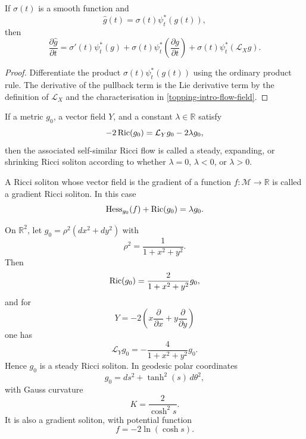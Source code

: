 \begin{proposition}
\label{topping-intro-pushforward-evolution}
If $\sigma(t)$ is a smooth function and
\[
\hat g(t)=\sigma(t)\psi_t^*(g(t)),
\]
then
\[
\frac{\partial \hat g}{\partial t}
=\sigma'(t)\psi_t^*(g)+\sigma(t)\psi_t^*\!\left(\frac{\partial g}{\partial t}\right)
+\sigma(t)\psi_t^*(\mathcal L_X g).
\]
\end{proposition}

\begin{proof}
Differentiate the product $\sigma(t)\psi_t^*(g(t))$ using the ordinary product
rule. The derivative of the pullback term is the Lie derivative term by the
definition of $\mathcal L_X$ and the characterisation in
\eqref{topping-intro-flow-field}.
\end{proof}

\begin{definition}
\label{topping-intro-ricci-soliton}
If a metric $g_0$, a vector field $Y$, and a constant $\lambda\in\mathbb R$
satisfy
\[
-2\operatorname{Ric}(g_0)=\mathcal L_Y g_0-2\lambda g_0,
\]
then the associated self-similar Ricci flow is called a steady, expanding, or
shrinking Ricci soliton according to whether $\lambda=0$, $\lambda<0$, or
$\lambda>0$.
\end{definition}

\begin{definition}
\label{topping-intro-gradient-soliton}
A Ricci soliton whose vector field is the gradient of a function
$f:\mathcal M\to\mathbb R$ is called a gradient Ricci soliton. In this case
\[
\operatorname{Hess}_{g_0}(f)+\operatorname{Ric}(g_0)=\lambda g_0.
\]
\end{definition}

\begin{example}
\label{topping-intro-cigar-soliton}
On $\mathbb R^2$, let $g_0=\rho^2(dx^2+dy^2)$ with
\[
\rho^2=\frac{1}{1+x^2+y^2}.
\]
Then
\[
\operatorname{Ric}(g_0)=\frac{2}{1+x^2+y^2}g_0,
\]
and for
\[
Y=-2\!\left(x\frac{\partial}{\partial x}+y\frac{\partial}{\partial y}\right)
\]
one has
\[
\mathcal L_Y g_0=-\frac{4}{1+x^2+y^2}g_0.
\]
Hence $g_0$ is a steady Ricci soliton. In geodesic polar coordinates
\[
g_0=ds^2+\tanh^2(s)\,d\theta^2,
\]
with Gauss curvature
\[
K=\frac{2}{\cosh^2 s}.
\]
It is also a gradient soliton, with potential function
\[
f=-2\ln(\cosh s).
\]
\end{example}

